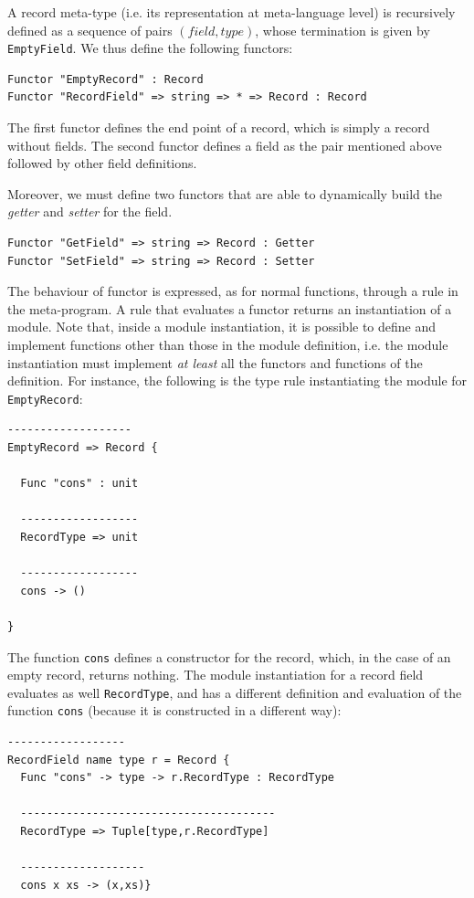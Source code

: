 A record meta-type (i.e. its representation at meta-language level) is recursively defined as a sequence of pairs $(field,type)$, whose termination is given by \texttt{EmptyField}. We thus define the following functors:

\begin{lstlisting}
Functor "EmptyRecord" : Record
Functor "RecordField" => string => * => Record : Record
\end{lstlisting}

\noindent
The first functor defines the end point of a record, which is simply a record without fields. The second functor defines a field as the pair mentioned above followed by other field definitions.

Moreover, we must define two functors that are able to dynamically build the \textit{getter} and \textit{setter} for the field.

\begin{lstlisting}
Functor "GetField" => string => Record : Getter
Functor "SetField" => string => Record : Setter
\end{lstlisting}

The behaviour of functor is expressed, as for normal functions, through a rule in the meta-program. A rule that evaluates a functor returns an instantiation of a module. Note that, inside a module instantiation, it is possible to define and implement functions other than those in the module definition, i.e. the module instantiation must implement \textit{at least} all the functors and functions of the definition. For instance, the following is the type rule instantiating the module for \texttt{EmptyRecord}:

\begin{lstlisting}
-------------------
EmptyRecord => Record {

  Func "cons" : unit

  ------------------
  RecordType => unit

  ------------------
  cons -> ()

}
\end{lstlisting}

\noindent
The function \texttt{cons} defines a constructor for the record, which, in the case of an empty record, returns nothing. The module instantiation for a record field evaluates as well \texttt{RecordType}, and has a different definition and evaluation of the function \texttt{cons} (because it is constructed in a different way):

\begin{lstlisting}
------------------
RecordField name type r = Record {
  Func "cons" -> type -> r.RecordType : RecordType
  
  ---------------------------------------
  RecordType => Tuple[type,r.RecordType]
  
  -------------------
  cons x xs -> (x,xs)} 
\end{lstlisting}

